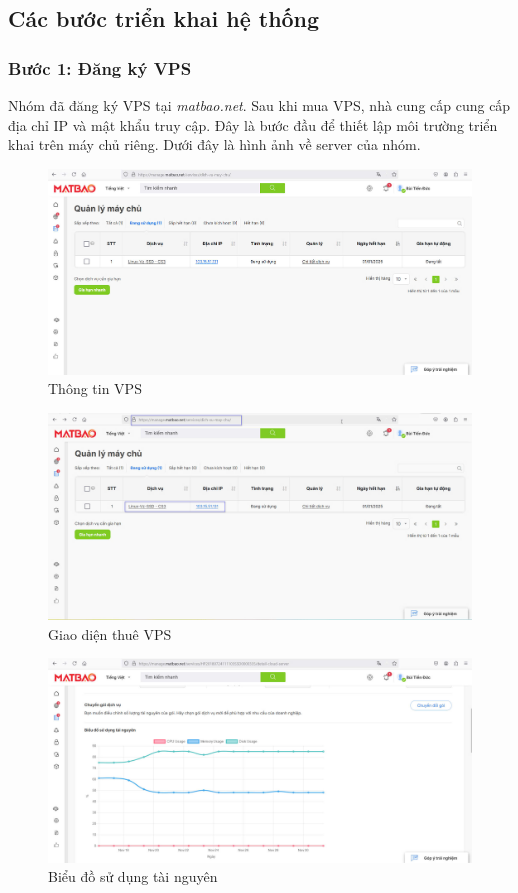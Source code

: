 \subsection{Các bước triển khai hệ thống}

\subsubsection{Bước 1: Đăng ký VPS}
Nhóm đã đăng ký VPS tại \textit{matbao.net}. Sau khi mua VPS, nhà cung cấp cung cấp địa chỉ IP và mật khẩu truy cập. Đây là bước đầu để thiết lập môi trường triển khai trên máy chủ riêng. Dưới đây là hình ảnh về server của nhóm.

\begin{figure}[H]
    \centering
    \includegraphics[width=0.8\linewidth]{images/vps1.jpg}
    \vspace{0.5cm}
    \caption{Thông tin VPS}
\end{figure}

\begin{figure}[H]
    \centering
    \includegraphics[width=0.8\linewidth]{images/vps4.jpg}
    \vspace{0.5cm}
    \caption{Giao diện thuê VPS}    
\end{figure}

\begin{figure}[H]
    \centering
    \includegraphics[width=0.8\linewidth]{images/vps2.jpg}
    \vspace{0.5cm} 
    \caption{Biểu đồ sử dụng tài nguyên}    
\end{figure}

